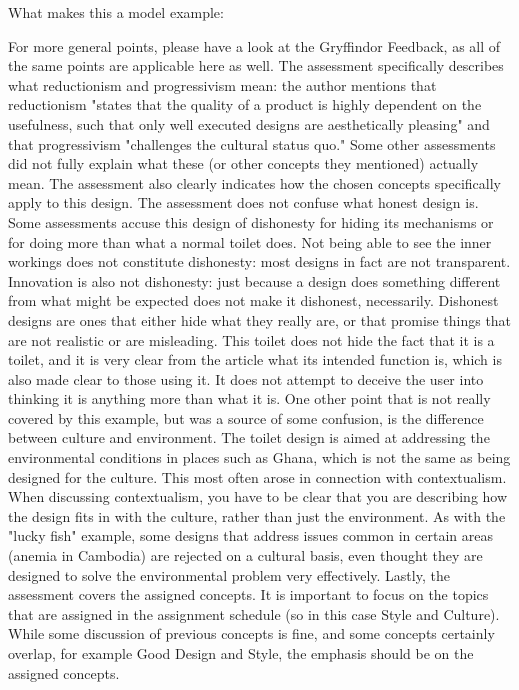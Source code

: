 \documentclass{article}
\begin{document}
What makes this a model example:

For more general points, please have a look at the Gryffindor Feedback, as all of the same points are applicable here as well.
The assessment specifically describes what reductionism and progressivism mean: the author mentions that reductionism "states that the quality of a product is highly dependent on the usefulness, such that only well executed designs are aesthetically pleasing" and that progressivism "challenges the cultural status quo." Some other assessments did not fully explain what these (or other concepts they mentioned) actually mean. The assessment also clearly indicates how the chosen concepts specifically apply to this design.
The assessment does not confuse what honest design is. Some assessments accuse this design of dishonesty for hiding its mechanisms or for doing more than what a normal toilet does. Not being able to see the inner workings does not constitute dishonesty: most designs in fact are not transparent. Innovation is also not dishonesty: just because a design does something different from what might be expected does not make it dishonest, necessarily. Dishonest designs are ones that either hide what they really are, or that promise things that are not realistic or are misleading. This toilet does not hide the fact that it is a toilet, and it is very clear from the article what its intended function is, which is also made clear to those using it. It does not attempt to deceive the user into thinking it is anything more than what it is.
One other point that is not really covered by this example, but was a source of some confusion, is the difference between culture and environment. The toilet design is aimed at addressing the environmental conditions in places such as Ghana, which is not the same as being designed for the culture. This most often arose in connection with contextualism. When discussing contextualism, you have to be clear that you are describing how the design fits in with the culture, rather than just the environment. As with the "lucky fish" example, some designs that address issues common in certain areas (anemia in Cambodia) are rejected on a cultural basis, even thought they are designed to solve the environmental problem very effectively.
Lastly, the assessment covers the assigned concepts. It is important to focus on the topics that are assigned in the assignment schedule (so in this case Style and Culture). While some discussion of previous concepts is fine, and some concepts certainly overlap, for example Good Design and Style, the emphasis should be on the assigned concepts.
\end{document}
